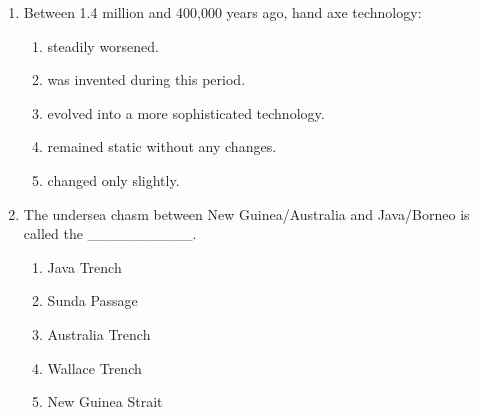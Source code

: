 \documentclass[12pt]{article}
\begin{document}
\begin{enumerate}[label=\arabic*.]
\item Between 1.4 million and 400,000 years ago, hand axe technology:
\begin{enumerate}[label=(\alph*)]
    \item steadily worsened.
    \item was invented during this period.
    \item evolved into a more sophisticated technology.
    \item remained static without any changes.
    \item changed only slightly.
\end{enumerate}
\item The undersea chasm between New Guinea/Australia and Java/Borneo is called the \_\_\_\_\_\_\_\_\_\_.
\begin{enumerate}[label=(\alph*)]
    \item Java Trench
    \item Sunda Passage
    \item Australia Trench
    \item Wallace Trench
    \item New Guinea Strait
\end{enumerate}
\end{enumerate}
\end{document}
